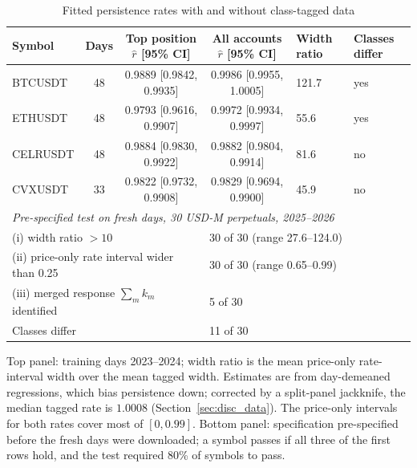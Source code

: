 \documentclass[12pt]{article}
\theoremstyle{definition}
\theoremstyle{remark}
\begin{document}
\begin{table}[t]\centering\small
\begin{threeparttable}
\caption{Fitted persistence rates with and without class-tagged data}\label{tab:disc}
\setlength{\tabcolsep}{3pt}
\begin{tabular}{lcccp{}p{}}
\toprule
Symbol & Days & Top position $\hat r$ [95\% CI] & All accounts $\hat r$ [95\% CI] & Width ratio & Classes differ\\
\midrule
BTCUSDT & 48 & 0.9889 [0.9842, 0.9935] & 0.9986 [0.9955, 1.0005] & 121.7 & yes\\
ETHUSDT & 48 & 0.9793 [0.9616, 0.9907] & 0.9972 [0.9934, 0.9997] & 55.6 & yes\\
CELRUSDT & 48 & 0.9884 [0.9830, 0.9922] & 0.9882 [0.9804, 0.9914] & 81.6 & no\\
CVXUSDT & 33 & 0.9822 [0.9732, 0.9908] & 0.9829 [0.9694, 0.9900] & 45.9 & no\\
\midrule
\multicolumn{6}{l}{\emph{Pre-specified test on fresh days, 30 USD-M perpetuals, 2025--2026}}\\
\multicolumn{3}{l}{(i) width ratio $>10$} & \multicolumn{3}{l}{30 of 30 (range 27.6--124.0)}\\
\multicolumn{3}{l}{(ii) price-only rate interval wider than 0.25} & \multicolumn{3}{l}{30 of 30 (range 0.65--0.99)}\\
\multicolumn{3}{l}{(iii) merged response $\sum_mk_m$ identified} & \multicolumn{3}{l}{5 of 30}\\
\multicolumn{3}{l}{Classes differ} & \multicolumn{3}{l}{11 of 30}\\
\bottomrule
\end{tabular}
\begin{tablenotes}\footnotesize\item Top panel: training days 2023--2024; width ratio is the mean price-only rate-interval width over the mean tagged width. Estimates are from day-demeaned regressions, which bias persistence down; corrected by a split-panel jackknife, the median tagged rate is $1.0008$ (Section~\ref{sec:disc_data}). The price-only intervals for both rates cover most of $[0,0.99]$. Bottom panel: specification pre-specified before the fresh days were downloaded; a symbol passes if all three of the first rows hold, and the test required 80\% of symbols to pass. \end{tablenotes}
\end{threeparttable}
\end{table}
\end{document}

